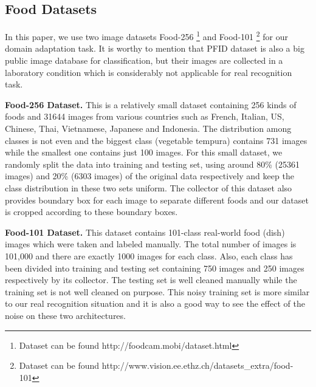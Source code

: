 \subsection{Food Datasets}
 In this paper, we use two image datasets Food-256 \cite{kawano14c}\footnote{Dataset can be found http://foodcam.mobi/dataset.html} and Food-101 \cite{bossard14}\footnote{Dataset can be found http://www.vision.ee.ethz.ch/datasets\_extra/food-101} for our domain adaptation task. It is worthy to mention that PFID dataset is also a big public image database for classification, but their images are collected in a laboratory condition which is considerably not applicable for real recognition task.

\textbf{Food-256 Dataset.}
This is a relatively small dataset containing 256 kinds of foods and 31644 images from various countries such as French, Italian, US, Chinese, Thai, Vietnamese, Japanese and Indonesia. The distribution among classes is not even and the biggest class (vegetable tempura) contains 731 images while the smallest one contains just 100 images. For this small dataset, we randomly split the data into training and testing set, using around 80\% (25361 images) and 20\% (6303 images) of the original data respectively and keep the class distribution in these two sets uniform. The collector of this dataset also provides boundary box for each image to separate different foods and our dataset is cropped according to these boundary boxes.

\textbf{Food-101 Dataset.}
This dataset contains 101-class real-world food (dish) images which were taken and labeled manually. The total number of images is 101,000 and there are exactly 1000 images for each class. Also, each class has been divided into training and testing set containing 750 images and 250 images respectively by its collector. The testing set is well cleaned manually while the training set is not well cleaned on purpose. This noisy training set is more similar to our real recognition situation and it is also a good way to see the effect of the noise on these two architectures.

